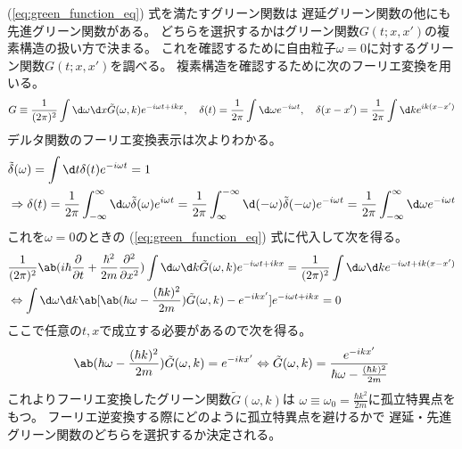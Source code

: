 (\ref{eq:green_function_eq}) 式を満たすグリーン関数は
遅延グリーン関数の他にも先進グリーン関数がある。
どちらを選択するかはグリーン関数$G(t;x,x')$の複素構造の扱い方で決まる。
これを確認するために自由粒子$\omega=0$に対するグリーン関数$G(t;x,x')$を調べる。
複素構造を確認するために次のフーリエ変換を用いる。
\begin{equation}
  \begin{split}
    G\equiv
    \frac{1}{(2\pi)^2}\int \d\omega\d x
    \tilde{G}(\omega,k)e^{-i\omega t+ikx},\quad
    \delta(t)=\frac{1}{2\pi}\int\d\omega e^{-i\omega t},\quad
    \delta(x-x')=\frac{1}{2\pi}\int\d k e^{ik(x-x')}
  \end{split}
\end{equation}
デルタ関数のフーリエ変換表示は次よりわかる。
\begin{equation}
  \begin{split}
    &\tilde{\delta}(\omega)
    =\int\d t\delta(t)e^{-i\omega t}
    = 1 \\
    &\Rightarrow
    \delta(t)
    =\frac{1}{2\pi}\int_{-\infty}^\infty\d \omega\tilde{\delta}(\omega)e^{i\omega t}
    =\frac{1}{2\pi}\int_\infty^{-\infty}
    \d (-\omega)\tilde{\delta}(-\omega)e^{-i\omega t}
    =\frac{1}{2\pi}\int_{-\infty}^\infty
    \d\omega e^{-i\omega t}
  \end{split}
\end{equation}
これを$\omega=0$のときの (\ref{eq:green_function_eq}) 式に代入して次を得る。
\begin{equation}
  \begin{split}
    &\frac{1}{(2\pi)^2}\ab(i\hbar\pdv{}{t}+\frac{\hbar^2}{2m}\pdv[order={2}]{}{x})
    \int \d\omega\d k
    \tilde{G}(\omega,k)e^{-i\omega t+ikx}
    =\frac{1}{(2\pi)^2}
    \int\d\omega\d k e^{-i\omega t+ik(x-x')} \\
    &\Leftrightarrow
    \int\d\omega\d k
    \ab[\ab(\hbar\omega-\frac{(\hbar k)^2}{2m})\tilde{G}(\omega,k)-e^{-ikx'}]
    e^{-i\omega t+ikx} = 0
  \end{split}
\end{equation}
ここで任意の$t,x$で成立する必要があるので次を得る。
\begin{equation}
  \begin{split}
    \ab(\hbar\omega-\frac{(\hbar k)^2}{2m})\tilde{G}(\omega,k)
    =e^{-ikx'}
    \Leftrightarrow
    \tilde{G}(\omega,k)
    =\frac{e^{-ikx'}}{\hbar\omega-\frac{(\hbar k)^2}{2m}}
  \end{split}
\end{equation}
これよりフーリエ変換したグリーン関数$\tilde{G}(\omega,k)$は
$\omega\equiv\omega_0=\frac{\hbar k^2}{2m}$に孤立特異点をもつ。
フーリエ逆変換する際にどのように孤立特異点を避けるかで
遅延・先進グリーン関数のどちらを選択するか決定される。


